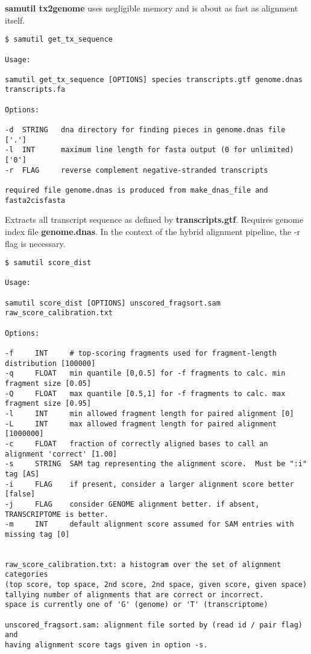 \documentclass[10pt]{article}
\begin{document}
\textbf{samutil tx2genome} uses negligible memory and is about as fast
as alignment itself.

{\small
\begin{verbatim}
$ samutil get_tx_sequence

Usage:

samutil get_tx_sequence [OPTIONS] species transcripts.gtf genome.dnas transcripts.fa 

Options:

-d  STRING   dna directory for finding pieces in genome.dnas file ['.']
-l  INT      maximum line length for fasta output (0 for unlimited) ['0']
-r  FLAG     reverse complement negative-stranded transcripts

required file genome.dnas is produced from make_dnas_file and fasta2cisfasta
\end{verbatim}
}


Extracts all transcript sequence as defined by
\textbf{transcripts.gtf}. Requires genome index file
\textbf{genome.dnas}. In the context of the hybrid alignment pipeline,
the -r flag is necessary.

{\small
\begin{verbatim}
$ samutil score_dist

Usage:

samutil score_dist [OPTIONS] unscored_fragsort.sam raw_score_calibration.txt

Options:

-f     INT     # top-scoring fragments used for fragment-length distribution [100000]
-q     FLOAT   min quantile [0,0.5] for -f fragments to calc. min fragment size [0.05]
-Q     FLOAT   max quantile [0.5,1] for -f fragments to calc. max fragment size [0.95]
-l     INT     min allowed fragment length for paired alignment [0]
-L     INT     max allowed fragment length for paired alignment [1000000]
-c     FLOAT   fraction of correctly aligned bases to call an alignment 'correct' [1.00]
-s     STRING  SAM tag representing the alignment score.  Must be ":i" tag [AS]
-i     FLAG    if present, consider a larger alignment score better [false]
-j     FLAG    consider GENOME alignment better. if absent, TRANSCRIPTOME is better.
-m     INT     default alignment score assumed for SAM entries with missing tag [0]


raw_score_calibration.txt: a histogram over the set of alignment categories
(top score, top space, 2nd score, 2nd space, given score, given space)
tallying number of alignments that are correct or incorrect.
space is currently one of 'G' (genome) or 'T' (transcriptome)

unscored_fragsort.sam: alignment file sorted by (read id / pair flag) and
having alignment score tags given in option -s.
\end{verbatim}
}
\end{document}
